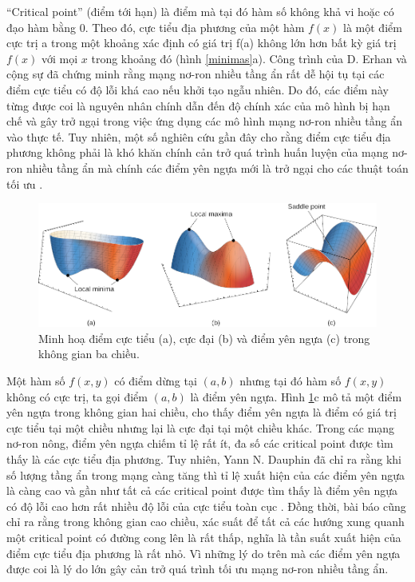 ``Critical point'' (điểm tới hạn) là điểm mà tại đó hàm số không khả vi hoặc có đạo hàm bằng 0. Theo đó, cực tiểu địa phương của một hàm $f(x)$ là một điểm cực trị a trong một khoảng xác định có giá trị f(a) không lớn hơn bất kỳ giá trị $f(x)$ với mọi $x$ trong khoảng đó (hình \ref{minimas}a). Công trình của D. Erhan và cộng sự \cite{erhan2009thedifficulty} đã chứng minh rằng mạng nơ-ron nhiều tầng ẩn rất dễ hội tụ tại các điểm cực tiểu có độ lỗi khá cao nếu khởi tạo ngẫu nhiên. Do đó, các điểm này từng được coi là nguyên nhân chính dẫn đến độ chính xác của mô hình bị hạn chế \cite{bengio2007scaling} và gây trở ngại trong việc ứng dụng các mô hình mạng nơ-ron nhiều tầng ẩn vào thực tế. Tuy nhiên, một số nghiên cứu gần đây cho rằng điểm cực tiểu địa phương không phải là khó khăn chính cản trở quá trình huấn luyện của mạng nơ-ron nhiều tầng ẩn mà chính các điểm yên ngựa mới là trở ngại cho các thuật toán tối ưu \cite{dauphin2014identifying}.

\begin{figure}[htp]
	\centering
	\includegraphics[width=140 mm]{images/minimas.png}
	\caption{Minh hoạ điểm cực tiểu (a), cực đại (b) và điểm yên ngựa (c) trong không gian ba chiều.}
	\label{fig:minimas}
\end{figure}

Một hàm số $f(x,y)$ có điểm dừng tại $(a,b)$ nhưng tại đó hàm số $f(x,y)$ không có cực trị, ta gọi điểm $(a,b)$ là điểm yên ngựa. Hình \ref{fig:minimas}c mô tả một điểm yên ngựa trong không gian hai chiều, cho thấy điểm yên ngựa là điểm có giá trị cực tiểu tại một chiều nhưng lại là cực đại tại một chiều khác. Trong các mạng nơ-ron nông, điểm yên ngựa chiếm tỉ lệ rất ít, đa số các critical point được tìm thấy là các cực tiểu địa phương. Tuy nhiên, Yann N. Dauphin đã chỉ ra rằng khi số lượng tầng ẩn trong mạng càng tăng thì tỉ lệ xuất hiện của các điểm yên ngựa là càng cao và gần như tất cả các critical point được tìm thấy là điểm yên ngựa có độ lỗi cao hơn rất nhiều độ lỗi của cực tiểu toàn cục \cite{dauphin2014identifying}. Đồng thời, bài báo cũng chỉ ra rằng trong không gian cao chiều, xác suất để tất cả các hướng xung quanh một critical point có đường cong lên là rất thấp, nghĩa là tần suất xuất hiện của điểm cực tiểu địa phương là rất nhỏ. Vì những lý do trên mà các điểm yên ngựa được coi là lý do lớn gây cản trở quá trình tối ưu mạng nơ-ron nhiều tầng ẩn.

